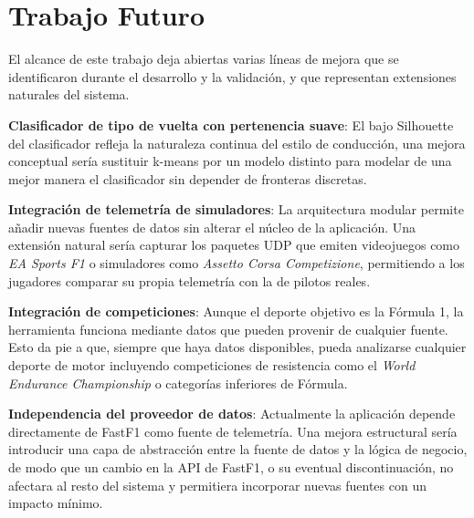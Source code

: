 \documentclass[12pt,a4paper,twoside,openright]{book}
\begin{document}
\section{Trabajo Futuro}
El alcance de este trabajo deja abiertas varias líneas de mejora que se identificaron durante el desarrollo y la validación, y que representan extensiones naturales del sistema.

\noindent \textbf{Clasificador de tipo de vuelta con pertenencia suave}: El bajo Silhouette del clasificador refleja la naturaleza continua del estilo de conducción, una mejora conceptual sería sustituir k-means por un modelo distinto para modelar de una mejor manera el clasificador sin depender de fronteras discretas. 

\noindent \textbf{Integración de telemetría de simuladores}: La arquitectura modular permite añadir nuevas fuentes de datos sin alterar el núcleo de la aplicación. Una extensión natural sería capturar los paquetes UDP que emiten videojuegos como \textit{EA Sports F1} o simuladores como \textit{Assetto Corsa Competizione}, permitiendo a los jugadores comparar su propia telemetría con la de pilotos reales.

\noindent \textbf{Integración de competiciones}: Aunque el deporte objetivo es la Fórmula 1, la herramienta funciona mediante datos que pueden provenir de cualquier fuente. Esto da pie a que, siempre que haya datos disponibles, pueda analizarse cualquier deporte de motor incluyendo competiciones de resistencia como el \textit{World Endurance Championship} o categorías inferiores de Fórmula.

\noindent \textbf{Independencia del proveedor de datos}: Actualmente la aplicación depende directamente de FastF1 como fuente de telemetría. Una mejora estructural sería introducir una capa de abstracción entre la fuente de datos y la lógica de negocio, de modo que un cambio en la API de FastF1, o su eventual discontinuación, no afectara al resto del sistema y permitiera incorporar nuevas fuentes con un impacto mínimo.
\end{document}
